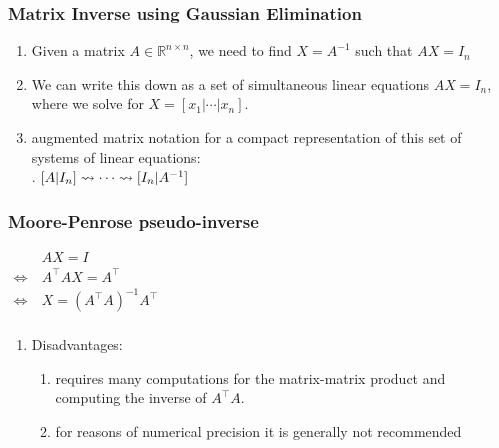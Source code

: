 \subsubsection{Matrix Inverse using Gaussian Elimination}

\begin{enumerate}
    \item Given a matrix $A \in \mathbb{R}^{n\times n}$, we need to find $X = A^{-1}$ such that $AX = I_n$
    \hfill \cite{mfml/book/mml/Deisenroth-Faisal-Ong}
    
    \item We can write this down as a set of simultaneous linear equations $AX = I_n$, where we solve for $X = [x_1| \cdots |x_n]$. 
    \hfill \cite{mfml/book/mml/Deisenroth-Faisal-Ong}

    \item augmented matrix notation for a compact representation of this set of systems of linear equations:
    \hfill \cite{mfml/book/mml/Deisenroth-Faisal-Ong}
    \\
    .\hfill
    $
        [A|I_n] \mathrel{\leadsto} \cdots \mathrel{\leadsto} [I_n|A^{-1}]
    $
    \hfill \cite{mfml/book/mml/Deisenroth-Faisal-Ong}

    
\end{enumerate}




\subsubsection{Moore-Penrose pseudo-inverse}

$
    \begin{aligned}
                         & AX = I \\
        \Leftrightarrow\ & A^\top AX = A^\top \\
        \Leftrightarrow\ & X = (A^\top A)^{-1} A^\top \\
    \end{aligned}
$
\hfill \cite{mfml/book/mml/Deisenroth-Faisal-Ong}


\vspace{0.2cm}

\begin{enumerate}
    \item Disadvantages:
    \begin{enumerate}
        \item requires many computations for the matrix-matrix product and computing the inverse of $A^\top A$. 
        \hfill \cite{mfml/book/mml/Deisenroth-Faisal-Ong}

        \item for reasons of numerical precision it is generally not recommended
        \hfill \cite{mfml/book/mml/Deisenroth-Faisal-Ong}
    \end{enumerate}
\end{enumerate}





